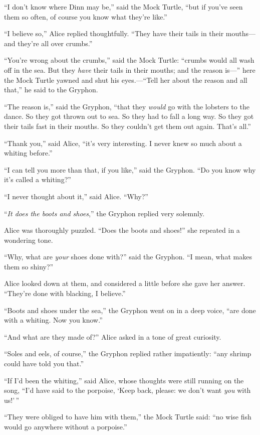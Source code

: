 \documentclass[book, 20pt]{extbook}
\begin{document}
``I don't know where Dinn may be,'' said the Mock Turtle, ``but if
you've seen them so often, of course you know what they're like.''

``I believe so,'' Alice replied thoughtfully. ``They have their tails in
their mouths---and they're all over crumbs.''

``You're wrong about the crumbs,'' said the Mock Turtle: ``crumbs would
all wash off in the sea. But they \emph{have} their tails in their
mouths; and the reason is---'' here the Mock Turtle yawned and shut his
eyes.---``Tell her about the reason and all that,'' he said to the
Gryphon.

``The reason is,'' said the Gryphon, ``that they \emph{would} go with
the lobsters to the dance. So they got thrown out to sea. So they had to
fall a long way. So they got their tails fast in their mouths. So they
couldn't get them out again. That's all.''

``Thank you,'' said Alice, ``it's very interesting. I never knew so much
about a whiting before.''

``I can tell you more than that, if you like,'' said the Gryphon. ``Do
you know why it's called a whiting?''

``I never thought about it,'' said Alice. ``Why?''

``\emph{It does the boots and shoes},'' the Gryphon replied very
solemnly.

Alice was thoroughly puzzled. ``Does the boots and shoes!'' she repeated
in a wondering tone.

``Why, what are \emph{your} shoes done with?'' said the Gryphon. ``I
mean, what makes them so shiny?''

Alice looked down at them, and considered a little before she gave her
answer. ``They're done with blacking, I believe.''

``Boots and shoes under the sea,'' the Gryphon went on in a deep voice,
``are done with a whiting. Now you know.''

``And what are they made of?'' Alice asked in a tone of great curiosity.

``Soles and eels, of course,'' the Gryphon replied rather impatiently:
``any shrimp could have told you that.''

``If I'd been the whiting,'' said Alice, whose thoughts were still
running on the song, ``I'd have said to the porpoise, `Keep back,
please: we don't want \emph{you} with us!'\,''

``They were obliged to have him with them,'' the Mock Turtle said: ``no
wise fish would go anywhere without a porpoise.''
\end{document}
